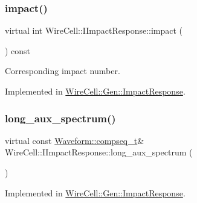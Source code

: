 \subsubsection{\texorpdfstring{impact()}{impact()}}
{\footnotesize\ttfamily virtual int Wire\+Cell\+::\+I\+Impact\+Response\+::impact (\begin{DoxyParamCaption}{ }\end{DoxyParamCaption}) const\hspace{0.3cm}{\ttfamily [pure virtual]}}



Corresponding impact number. 



Implemented in \hyperlink{class_wire_cell_1_1_gen_1_1_impact_response_a664b5b110cc63973d357bcf9c9f155d8}{Wire\+Cell\+::\+Gen\+::\+Impact\+Response}.

\mbox{\label{class_wire_cell_1_1_i_impact_response_a9f7ad74ee3cbc5b5cb5138d4bfaf29b5}} 
\subsubsection{\texorpdfstring{long\+\_\+aux\+\_\+spectrum()}{long\_aux\_spectrum()}}
{\footnotesize\ttfamily virtual const \hyperlink{namespace_wire_cell_1_1_waveform_a7e4a8d371f774438bb360e7d1dcb583a}{Waveform\+::compseq\+\_\+t}\& Wire\+Cell\+::\+I\+Impact\+Response\+::long\+\_\+aux\+\_\+spectrum (\begin{DoxyParamCaption}{ }\end{DoxyParamCaption})\hspace{0.3cm}{\ttfamily [pure virtual]}}



Implemented in \hyperlink{class_wire_cell_1_1_gen_1_1_impact_response_a8d8bd238c6286a8e6c70dc7a543a5ca3}{Wire\+Cell\+::\+Gen\+::\+Impact\+Response}.

\mbox{\label{class_wire_cell_1_1_i_impact_response_ac4f1779e2e202ddb853ec1df8fd38d6d}} 
